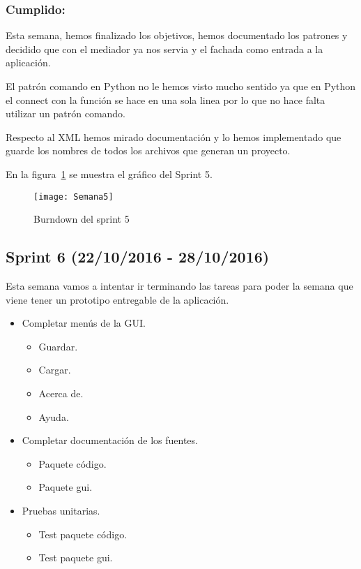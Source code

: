 \subsubsection{Cumplido:}
Esta semana, hemos finalizado los objetivos, hemos documentado los patrones y decidido que con el mediador ya nos servia y el fachada como entrada a la aplicación.
 
El patrón comando en Python no le hemos visto mucho sentido ya que en Python el connect con la función se hace en una sola linea por lo que no hace falta utilizar un patrón comando.

Respecto al XML hemos mirado documentación y lo hemos implementado que guarde los nombres de todos los archivos que generan un proyecto.

En la figura~\ref{fig:A.2.5} se muestra el gráfico del Sprint 5.

\begin{figure}[h]
\centering
\texttt{[image: Semana5]}
\caption{Burndown del sprint 5}
\label{fig:A.2.5}
\end{figure}
\subsection{Sprint 6 (22/10/2016 - 28/10/2016)}
Esta semana vamos a intentar ir terminando las tareas para poder la semana que viene tener un prototipo entregable de la aplicación.

\begin{itemize}
\item Completar menús de la GUI.
	\begin{itemize}
		\item Guardar.
		\item Cargar.
		\item Acerca de.
		\item Ayuda.
	\end{itemize}
\item Completar documentación de los fuentes.
	\begin{itemize}
		\item Paquete código.
		\item Paquete gui.
	\end{itemize}
\item Pruebas unitarias.
	\begin{itemize}
		\item Test paquete código.
		\item Test paquete gui.
	\end{itemize}
\end{itemize}
